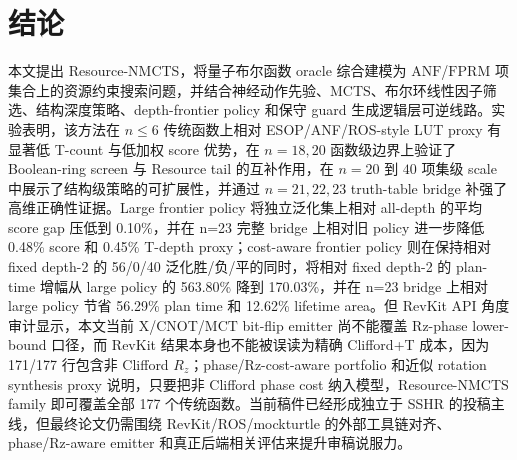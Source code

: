 \documentclass[UTF8,fontset=macnew,11pt]{ctexart}
\newcommand{\method}{Resource-NMCTS}
\newcommand{\screen}{Boolean-ring screen}
\newcommand{\anf}{\ensuremath{\mathrm{ANF}}}
\newcommand{\fprm}{\ensuremath{\mathrm{FPRM}}}
\newcommand{\mcts}{\ensuremath{\mathrm{MCTS}}}
\newcommand{\mct}{\ensuremath{\mathrm{MCT}}}
\begin{document}
\section{结论}

本文提出 \method{}，将量子布尔函数 oracle 综合建模为 \anf{}/\fprm{} 项集合上的资源约束搜索问题，并结合神经动作先验、\mcts{}、布尔环线性因子筛选、结构深度策略、depth-frontier policy 和保守 guard 生成逻辑层可逆线路。实验表明，该方法在 $n\leq6$ 传统函数上相对 ESOP/ANF/ROS-style LUT proxy 有显著低 T-count 与低加权 score 优势，在 $n=18,20$ 函数级边界上验证了 \screen{} 与 Resource tail 的互补作用，在 $n=20$ 到 $40$ 项集级 scale 中展示了结构级策略的可扩展性，并通过 $n=21,22,23$ truth-table bridge 补强了高维正确性证据。Large frontier policy 将独立泛化集上相对 all-depth 的平均 score gap 压低到 0.10\%，并在 n=23 完整 bridge 上相对旧 policy 进一步降低 0.48\% score 和 0.45\% T-depth proxy；cost-aware frontier policy 则在保持相对 fixed depth-2 的 56/0/40 泛化胜/负/平的同时，将相对 fixed depth-2 的 plan-time 增幅从 large policy 的 563.80\% 降到 170.03\%，并在 n=23 bridge 上相对 large policy 节省 56.29\% plan time 和 12.62\% lifetime area。但 RevKit API 角度审计显示，本文当前 X/CNOT/\mct{} bit-flip emitter 尚不能覆盖 Rz-phase lower-bound 口径，而 RevKit 结果本身也不能被误读为精确 Clifford+T 成本，因为 171/177 行包含非 Clifford $R_z$；phase/Rz-cost-aware portfolio 和近似 rotation synthesis proxy 说明，只要把非 Clifford phase cost 纳入模型，Resource-NMCTS family 即可覆盖全部 177 个传统函数。当前稿件已经形成独立于 SSHR 的投稿主线，但最终论文仍需围绕 RevKit/ROS/mockturtle 的外部工具链对齐、phase/Rz-aware emitter 和真正后端相关评估来提升审稿说服力。
\end{document}
